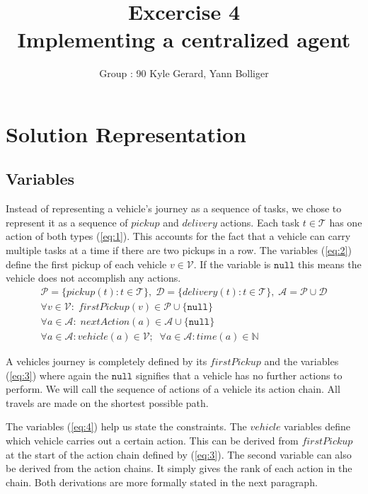 \documentclass[11pt]{article}
\title{\bf Excercise 4\\ Implementing a centralized agent}
\author{Group \textnumero : 90  Kyle Gerard, Yann Bolliger}
\begin{document}
\maketitle

\section{Solution Representation}

\subsection{Variables} 

Instead of representing a vehicle's journey as a sequence of tasks, we chose to
represent it as a sequence of $pickup$ and $delivery$ actions. Each task $t \in
\mathcal{T}$ has one action of both types (\ref{eq:1}). This accounts for the
fact that a vehicle can carry multiple tasks at a time if there are two pickups
in a row. 
The variables (\ref{eq:2}) define the first pickup of each vehicle
$v \in \mathcal{V}$. If the variable is $\mathtt{null}$ this means the vehicle 
does not accomplish any actions.
\begin{eqnarray} 
\label{eq:1}
\mathcal{P} = \{pickup(t) : t \in \mathcal{T}\} , \;  
\mathcal{D} = \{delivery(t) : t \in \mathcal{T}\} , \; 
\mathcal{A} =  \mathcal{P} \cup \mathcal{D}
\\
\label{eq:2}
\forall v \in \mathcal{V}  : \;
firstPickup(v)  \in \mathcal{P} \cup \{\mathtt{null}\} 
\\
\label{eq:3}
\forall a \in \mathcal{A}  : \;
nextAction(a) \in \mathcal{A}  \cup \{\mathtt{null}\} 
\\
\label{eq:4}
\forall a \in \mathcal{A}  :
vehicle(a) \in \mathcal{V};
\;\;
\forall a \in \mathcal{A}  :
time(a) \in \mathbb{N}
\end{eqnarray}

A vehicles journey is completely defined by its $firstPickup$ and the variables
(\ref{eq:3}) where again the $\mathtt{null}$ signifies that a vehicle has no
further actions to perform. We will call the sequence of actions of a vehicle
its action chain. All travels are made on the shortest possible path.

The variables (\ref{eq:4}) help us state the constraints. The $vehicle$
variables define which vehicle carries out a certain action. This can be derived
from $firstPickup$ at the start of the action chain defined by (\ref{eq:3}). The
second variable can also be derived from the action chains. It simply gives the
rank of each action in the chain. Both derivations are more formally stated in
the next paragraph.
\end{document}
